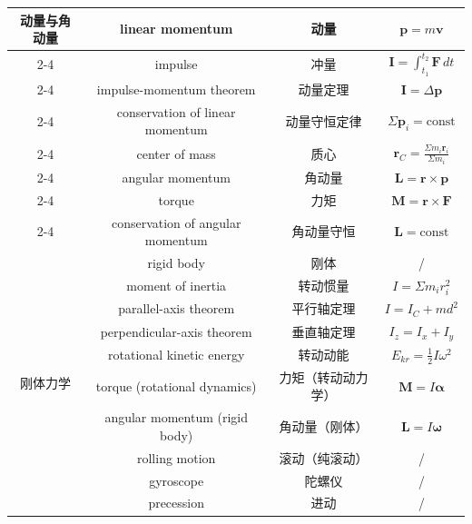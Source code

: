 \documentclass{article}
\begin{document}
\begin{longtable}{|c|c|c|c|}
  \multirow{8}{*}{动量与角动量}
  & linear momentum & 动量 & $\boldsymbol{p}=m\boldsymbol{v}$ \\
  \cline{2-4}
  & impulse & 冲量 & $\boldsymbol{I}=\int_{t_1}^{t_2}\boldsymbol{F}\,dt$ \\
  \cline{2-4}
  & impulse-momentum theorem & 动量定理 & $\boldsymbol{I}=\Delta\boldsymbol{p}$ \\
  \cline{2-4}
  & conservation of linear momentum & 动量守恒定律 & $\Sigma\boldsymbol{p}_i=\text{const}$ \\
  \cline{2-4}
  & center of mass & 质心 & $\boldsymbol{r}_C=\frac{\Sigma m_i\boldsymbol{r}_i}{\Sigma m_i}$ \\
  \cline{2-4}
  & angular momentum & 角动量 & $\boldsymbol{L}=\boldsymbol{r}\times\boldsymbol{p}$ \\
  \cline{2-4}
  & torque & 力矩 & $\boldsymbol{M}=\boldsymbol{r}\times\boldsymbol{F}$ \\
  \cline{2-4}
  & conservation of angular momentum & 角动量守恒 & $\boldsymbol{L}=\text{const}$ \\
  \hline

  \multirow{10}{*}{刚体力学}
  & rigid body & 刚体 & / \\
  \cline{2-4}
  & moment of inertia & 转动惯量 & $I=\Sigma m_i r_i^2$ \\
  \cline{2-4}
  & parallel-axis theorem & 平行轴定理 & $I=I_C+md^2$ \\
  \cline{2-4}
  & perpendicular-axis theorem & 垂直轴定理 & $I_z=I_x+I_y$ \\
  \cline{2-4}
  & rotational kinetic energy & 转动动能 & $E_{kr}=\frac{1}{2}I\omega^2$ \\
  \cline{2-4}
  & torque (rotational dynamics) & 力矩（转动动力学） & $\boldsymbol{M}=I\boldsymbol{\alpha}$ \\
  \cline{2-4}
  & angular momentum (rigid body) & 角动量（刚体） & $\boldsymbol{L}=I\boldsymbol{\omega}$ \\
  \cline{2-4}
  & rolling motion & 滚动（纯滚动） & / \\
  \cline{2-4}
  & gyroscope & 陀螺仪 & / \\
  \cline{2-4}
  & precession & 进动 & / \\
  \hline
\end{longtable}
\end{document}
